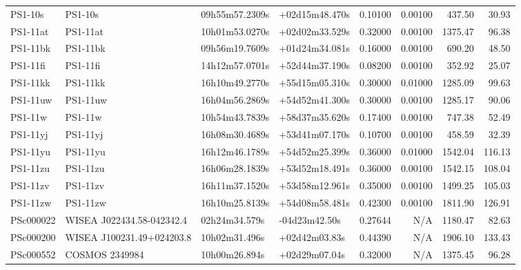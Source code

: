 \begin{longtable}{llllrrrr}
PS1-10s          &                         PS1-10s &  09h55m57.2309s &  +02d15m48.470s &  0.10100 &  0.00100 &   437.50 &       30.93 \\
PS1-11at         &                        PS1-11at &  10h01m53.0270s &  +02d02m33.529s &  0.32000 &  0.00100 &  1375.47 &       96.38 \\
PS1-11bk         &                        PS1-11bk &  09h56m19.7609s &  +01d24m34.081s &  0.16000 &  0.00100 &   690.20 &       48.50 \\
PS1-11fi         &                        PS1-11fi &  14h12m57.0701s &  +52d44m37.190s &  0.08200 &  0.00100 &   352.92 &       25.07 \\
PS1-11kk         &                        PS1-11kk &  16h10m49.2770s &  +55d15m05.310s &  0.30000 &  0.01000 &  1285.09 &       99.63 \\
PS1-11uw         &                        PS1-11uw &  16h04m56.2869s &  +54d52m41.300s &  0.30000 &  0.00100 &  1285.17 &       90.06 \\
PS1-11w          &                         PS1-11w &  10h54m43.7839s &  +58d37m35.620s &  0.17400 &  0.00100 &   747.38 &       52.49 \\
PS1-11yj         &                        PS1-11yj &  16h08m30.4689s &  +53d41m07.170s &  0.10700 &  0.00100 &   458.59 &       32.39 \\
PS1-11yu         &                        PS1-11yu &  16h12m46.1789s &  +54d52m25.399s &  0.36000 &  0.01000 &  1542.04 &      116.13 \\
PS1-11zu         &                        PS1-11zu &  16h06m28.1839s &  +53d52m18.491s &  0.36000 &  0.00100 &  1542.15 &      108.04 \\
PS1-11zv         &                        PS1-11zv &  16h11m37.1520s &  +53d58m12.961s &  0.35000 &  0.00100 &  1499.25 &      105.03 \\
PS1-11zw         &                        PS1-11zw &  16h10m25.8139s &  +54d08m58.481s &  0.42300 &  0.00100 &  1811.90 &      126.91 \\
PSc000022        &       WISEA J022434.58-042342.4 &   02h24m34.579s &   -04d23m42.50s &  0.27644 &      N/A &  1180.47 &       82.63 \\
PSc000200        &       WISEA J100231.49+024203.8 &   10h02m31.496s &   +02d42m03.83s &  0.44390 &      N/A &  1906.10 &      133.43 \\
PSc000552        &                  COSMOS 2349984 &   10h00m26.894s &   +02d29m07.04s &  0.32000 &      N/A &  1375.45 &       96.28 \\

\end{longtable}
